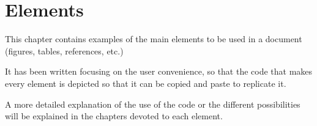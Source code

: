 \chapter{Elements}\label{ch:Elements}
\begin{chapter_resume}
This chapter contains examples of the main elements to be used in a document (figures, tables, references, etc.)

\vspace{0.7cm}

It has been written focusing on the user convenience, so that the code that makes every element is depicted so that it can be copied and paste to replicate it.
\vspace{0.7cm}

A more detailed explanation of the use of the code or the different possibilities will be explained in the chapters devoted to each element.
\end{chapter_resume}






